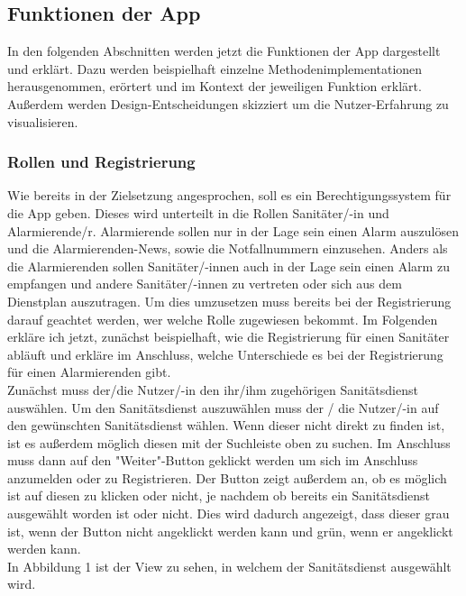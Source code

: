 \subsection{Funktionen der App}
        In den folgenden Abschnitten werden jetzt die Funktionen der App dargestellt und erklärt.
        Dazu werden beispielhaft einzelne Methodenimplementationen herausgenommen, erörtert und
        im Kontext der jeweiligen Funktion erklärt.
        Außerdem werden Design-Entscheidungen skizziert um die Nutzer-Erfahrung zu visualisieren.   
    \subsubsection{Rollen und Registrierung}
            Wie bereits in der Zielsetzung angesprochen, soll es ein Berechtigungssystem für die App geben.
            Dieses wird unterteilt in die Rollen Sanitäter/-in und Alarmierende/r. Alarmierende sollen nur in der Lage
            sein einen Alarm auszulösen und die Alarmierenden-News, sowie die Notfallnummern einzusehen.
            Anders als die Alarmierenden sollen Sanitäter/-innen auch in der Lage sein einen Alarm zu empfangen und 
            andere Sanitäter/-innen zu vertreten oder sich aus dem Dienstplan auszutragen.
            Um dies umzusetzen muss bereits bei der Registrierung darauf geachtet werden, wer welche Rolle 
            zugewiesen bekommt.
            Im Folgenden erkläre ich jetzt, zunächst beispielhaft, wie die Registrierung für einen Sanitäter 
            abläuft und erkläre im Anschluss, welche Unterschiede es bei der Registrierung für einen Alarmierenden gibt.
            \newline\\
            Zunächst muss der/die Nutzer/-in den ihr/ihm zugehörigen Sanitätsdienst auswählen.
            Um den Sanitätsdienst auszuwählen muss der / die Nutzer/-in auf den gewünschten Sanitätsdienst wählen. Wenn dieser nicht direkt zu finden ist,
            ist es außerdem möglich diesen mit der Suchleiste oben zu suchen. Im Anschluss muss dann auf den "Weiter"-Button geklickt werden um sich im Anschluss anzumelden oder zu Registrieren.
            Der Button zeigt außerdem an, ob es möglich ist auf diesen zu klicken oder nicht, je nachdem ob bereits ein Sanitätsdienst ausgewählt worden ist oder nicht. Dies wird dadurch angezeigt, 
            dass dieser grau ist, wenn der Button nicht angeklickt werden kann und grün, wenn er angeklickt werden kann.
            \\In Abbildung 1 ist der View zu sehen, in welchem der Sanitätsdienst ausgewählt wird.
            
